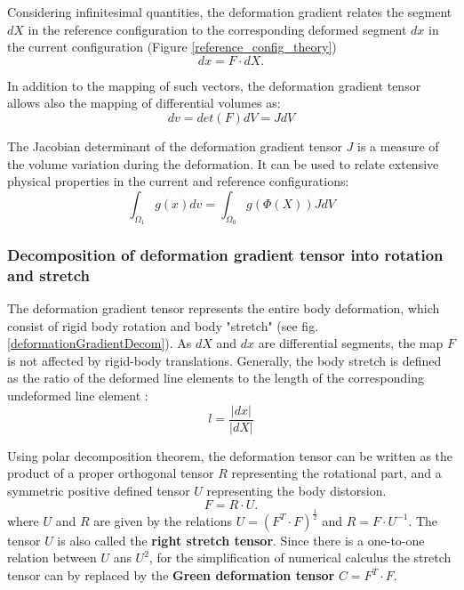 Considering infinitesimal quantities, the deformation gradient relates the segment $dX$ in the reference configuration to the corresponding deformed segment $dx$ in the current configuration (Figure \ref{reference_config_theory}) 
\begin{equation}
dx = F \cdot dX.
\label{deformationGradRelation}
\end{equation}

In addition to the mapping of such vectors, the deformation gradient tensor allows also the mapping of differential volumes as:
\begin{equation}
dv = det(F)dV = JdV
\end{equation}

The Jacobian determinant of the deformation gradient tensor $J$ is a measure of the volume variation during the deformation. It can be used to relate extensive physical properties in the current and reference configurations:
\begin{equation}
\int_{\Omega_1}g(x)dv = \int_{\Omega_0}g(\Phi(X))JdV
\label{JacobianRelation}
\end{equation}

\subsubsection*{Decomposition of deformation gradient tensor into rotation and stretch}\label{deformationgradienttensor}
The deformation gradient tensor represents the entire body deformation, which consist of rigid body rotation and body "stretch" (see fig. \ref{deformationGradientDecom}). As $dX$ and $dx$ are differential segments, the map $F$ is not affected by rigid-body translations.
Generally, the body stretch is defined as the ratio of the deformed line elements to the length of the corresponding undeformed line element :
\begin{equation}
l = \frac{\vert dx \vert}{\vert dX \vert}
\end{equation} 

Using polar decomposition theorem, the deformation tensor can be written as the product of a proper orthogonal tensor $R$ representing the rotational part, and a symmetric positive defined tensor $U$ representing the body distorsion. 
\begin{equation}
F = R \cdot U.
\end{equation}
where $U$ and $R$ are given by the relations $U = (F^T \cdot F)^ {\frac{1}{2}} $ and $R = F \cdot U^{-1}$. The tensor $U$ is also called the \textbf{right stretch tensor}.  Since there is a one-to-one relation between $U$ ans $U^2$, for the simplification of numerical calculus the stretch tensor can by replaced by the \textbf{Green deformation tensor} $C = F^T \cdot F$.


